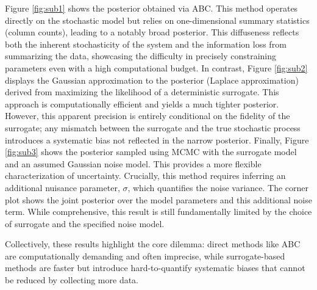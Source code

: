 \documentclass{article}
\begin{document}
Figure \ref{fig:sub1} shows the posterior obtained via ABC. This method operates directly on the stochastic model but relies on one-dimensional summary statistics (column counts), leading to a notably broad posterior. This diffuseness reflects both the inherent stochasticity of the system and the information loss from summarizing the data, showcasing the difficulty in precisely constraining parameters even with a high computational budget. In contrast, Figure \ref{fig:sub2} displays the Gaussian approximation to the posterior (Laplace approximation) derived from maximizing the likelihood of a deterministic surrogate. This approach is computationally efficient and yields a much tighter posterior. However, this apparent precision is entirely conditional on the fidelity of the surrogate; any mismatch between the surrogate and the true stochastic process introduces a systematic bias not reflected in the narrow posterior. Finally, Figure \ref{fig:sub3} shows the posterior sampled using MCMC with the surrogate model and an assumed Gaussian noise model. This provides a more flexible characterization of uncertainty. Crucially, this method requires inferring an additional nuisance parameter, $\sigma$, which quantifies the noise variance. The corner plot shows the joint posterior over the model parameters and this additional noise term. While comprehensive, this result is still fundamentally limited by the choice of surrogate and the specified noise model. 

Collectively, these results highlight the core dilemma: direct methods like ABC are computationally demanding and often imprecise, while surrogate-based methods are faster but introduce hard-to-quantify systematic biases that cannot be reduced by collecting more data.
\end{document}
